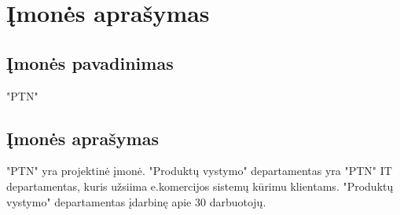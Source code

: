 \section{Įmonės aprašymas}

\subsection{Įmonės pavadinimas}
"PTN"



\subsection{Įmonės aprašymas}


"PTN" yra projektinė įmonė. "Produktų vystymo" departamentas yra "PTN" IT departamentas, kuris užsiima e.komercijos sistemų kūrimu klientams. "Produktų vystymo" departamentas įdarbinę apie 30 darbuotojų. 

